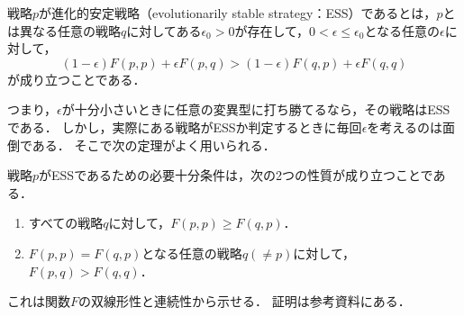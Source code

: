\begin{dfn}[進化的安定戦略]
  \label{ess}
  戦略$p$が進化的安定戦略（evolutionarily stable strategy：ESS）であるとは，$p$とは異なる任意の戦略$q$に対してある$\epsilon_0 >0$が存在して，$0<\epsilon\le \epsilon_0$となる任意の$\epsilon$に対して，
  \begin{equation}
    (1-\epsilon)F(p,p) + \epsilon F(p,q) > (1-\epsilon)F(q,p) + \epsilon F(q,q)
  \end{equation}
  が成り立つことである．
\end{dfn}

つまり，$\epsilon$が十分小さいときに任意の変異型に打ち勝てるなら，その戦略はESSである．
しかし，実際にある戦略がESSか判定するときに毎回$\epsilon$を考えるのは面倒である．
そこで次の定理がよく用いられる．
\begin{thm}
  戦略$p$がESSであるための必要十分条件は，次の2つの性質が成り立つことである．
  \begin{enumerate}
    \item すべての戦略$q$に対して，$F(p,p) \ge F(q,p)$．
    \item $F(p,p) = F(q,p)$となる任意の戦略$q(\neq p)$に対して，$F(p,q) > F(q,q)$．
  \end{enumerate}
\end{thm}

これは関数$F$の双線形性と連続性から示せる．
証明は参考資料\cite{game}にある．